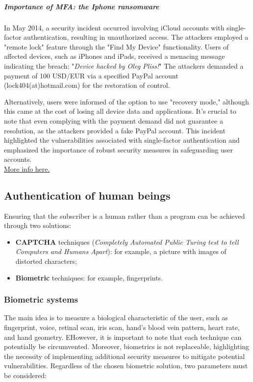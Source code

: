 \subparagraph{Importance of MFA: the Iphone ransomware}
In May 2014, a security incident occurred involving iCloud accounts with single-factor authentication, resulting in unauthorized access.
The attackers employed a "remote lock" feature through the "Find My Device" functionality. Users of affected devices, such as iPhones and iPads, received a menacing message indicating the breach: "\textit{Device hacked by Oleg Pliss!}"
The attackers demanded a payment of 100 USD/EUR via a specified PayPal account (lock404(at)hotmail.com) for the restoration of control.

Alternatively, users were informed of the option to use "recovery mode," although this came at the cost of losing all device data and applications. It's crucial to note that even complying with the payment demand did not guarantee a resolution, as the attackers provided a fake PayPal account.
This incident highlighted the vulnerabilities associated with single-factor authentication and emphasized the importance of robust security measures in safeguarding user accounts.\\
\href{http://thehackernews.com/2014/05/apple-devices-hacked-by-oleg-pliss-held.html}{More info here.}

\subsection{Authentication of human beings}
Ensuring that the subscriber is a human rather than a program can be achieved through two solutions:
\begin{itemize}
  \item \textbf{CAPTCHA} techniques (\textit{Completely Automated Public Turing test to tell Computers and Humans
          Apart}): for example, a picture with images of distorted characters;
  \item \textbf{Biometric} techniques: for example, fingerprints.
\end{itemize}


\subsubsection{Biometric systems}
The main idea is to measure a biological characteristic of the user, such as fingerprint, voice, retinal scan, iris scan, hand's blood vein pattern, heart rate, and hand geometry.
EHowever, it is important to note that each technique can potentially be circumvented. Moreover, biometrics is not replaceable, highlighting the necessity of implementing additional security measures to mitigate potential vulnerabilities.
Regardless of the chosen biometric solution, two parameters must be considered:

